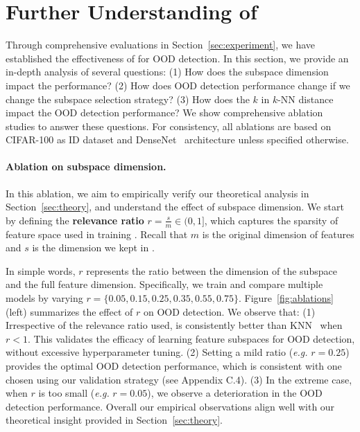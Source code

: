 
\section{Further Understanding of \name}
\label{sec:ablations}

Through comprehensive evaluations in Section~\ref{sec:experiment}, we have established the effectiveness of \name for OOD detection. 
\noindent In this section, we provide an in-depth analysis of several questions: (1) How does the subspace dimension impact the performance? (2) How does OOD detection performance change if we change the subspace selection strategy? 
(3) How does the $k$ in $k$-NN distance impact the OOD detection performance? We show comprehensive ablation studies to answer these questions. 
 For consistency, all ablations are based on CIFAR-100 as ID dataset and DenseNet~\cite{huang2018densely} architecture unless specified otherwise.
 


\paragraph{Ablation on subspace dimension.} In this ablation, we aim to empirically verify our theoretical analysis in Section~\ref{sec:theory}, and understand the effect of subspace dimension. 
We start by defining the \textbf{relevance ratio} $r = \frac{s}{m} \in (0,1]$, which captures the sparsity of feature space used in training \name. Recall that $m$ is the original dimension of features and $s$ is the dimension we kept in \name. 

In simple words, $r$ represents the ratio between the dimension of the subspace and the full feature dimension.
Specifically, we train and compare multiple models by varying $r = \{ 0.05, 0.15, 0.25, 0.35, 0.55, 0.75\}$. Figure~\ref{fig:ablations} (left) summarizes the effect of $r$ on OOD detection. We observe that: (1) Irrespective of the relevance ratio used, \name is consistently better than KNN~\cite{sun2022knn} when $r < 1$. This validates the efficacy of learning feature subspaces for OOD detection, without excessive hyperparameter tuning. (2) Setting a mild ratio (\emph{e.g.} $r=0.25$) provides the optimal OOD detection performance, which is consistent with one chosen using our validation strategy (see Appendix C.4). (3) In the extreme case, when $r$ is too small (\emph{e.g.} $r={0.05}$), we observe a deterioration in the OOD detection performance. Overall our empirical observations align well with our theoretical insight provided in Section~\ref{sec:theory}. 

